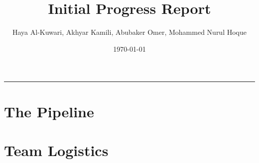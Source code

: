 \documentclass{article}
\title{Initial Progress Report}
\author{Haya Al-Kuwari, Akhyar Kamili, Abubaker Omer, Mohammed Nurul Hoque}
\date{\today}
\begin{document}
    \maketitle
    \hrule\relax
    \section{The Pipeline}
    \section{Team Logistics}
    
\end{document}

